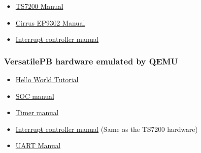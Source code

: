 \begin{itemize}
\itemsep1pt\parskip0pt
\item
  \href{http://www.cgl.uwaterloo.ca/~wmcowan/teaching/cs452/pdf/ts-7200-manual.pdf}{TS7200
  Manual}
\item
  \href{http://www.cgl.uwaterloo.ca/~wmcowan/teaching/cs452/pdf/ep93xx-user-guide.pdf}{Cirrus
  EP9302 Manual}
\item
  \href{http://www.cgl.uwaterloo.ca/~wmcowan/teaching/cs452/pdf/icu-pl190.pdf}{Interrupt
  controller manual}
\end{itemize}

\subsubsection{VersatilePB hardware emulated by
QEMU}\label{versatilepb-hardware-emulated-by-qemu}

\begin{itemize}
\itemsep1pt\parskip0pt
\item
  \href{https://balau82.wordpress.com/2010/02/28/hello-world-for-bare-metal-arm-using-qemu/}{Hello
  World Tutorial}
\item
  \href{http://infocenter.arm.com/help/topic/com.arm.doc.dui0224i/DUI0224I_realview_platform_baseboard_for_arm926ej_s_ug.pdf}{SOC
  manual}
\item
  \href{http://infocenter.arm.com/help/topic/com.arm.doc.ddi0271d/DDI0271.pdf}{Timer
  manual}
\item
  \href{http://infocenter.arm.com/help/topic/com.arm.doc.ddi0181e/DDI0181.pdf}{Interrupt
  controller manual} (Same as the TS7200 hardware)
\item
  \href{http://infocenter.arm.com/help/topic/com.arm.doc.ddi0183f/DDI0183.pdf}{UART
  Manual}
\end{itemize}
